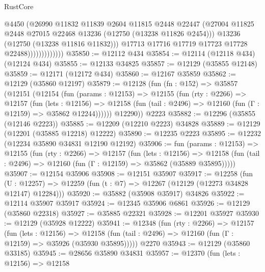 \begin{lexlean}{RustCore}
\begin{coremodule}
                              @4450
                              (@26990
                                @11832
                                @11839
                                @2604
                                @11815
                                @2448
                                @22447
                                (@27004
                                  @11825
                                  @2448
                                  @27015
                                  @22468
                                  @13236
                                  (@12750 (@13238 @11826 @2454)))
                                @13236
                                (@12750 (@13238 @11816 @11832)))
                              @17713
                              @17716
                              @17719
                              @17723
                              @17728
                              @22488)))))))))))))
@35850 := @12112 @434
@35854 := @12114 (@12118 @434) (@12124 @434)
@35855 := @12133 @34825
@35857 := @12129 (@35855 @12148)
@35859 := @12171 (@12172 @434)
@35860 := @12167 @35859
@35862 := @12129 (@35860 @12197)
@35879 := @12128
    (fun (fn : @152) =>
    @35857
      (@12151
        (@12154
          (fun (params : @12153) =>
          @12155
            (fun (rty : @2266) =>
            @12157
              (fun (lets : @12156) =>
              @12158 (fun (tail : @2496) => @12160 (fun (Γ : @12159) => @35862 @12244))))))
        @12290))
    @2223
@35882 := @12296 (@35855 (@12146 @2223))
@35885 := @12209 (@12210 @2223) @34828
@35889 := @12129 (@12201 (@35885 @12218) @12222)
@35890 := @12235 @2223
@35895 := @12232 (@12234 @35890 @34831 @12190 @12192)
@35906 := fun (params : @12153) =>
  @12155
    (fun (rty : @2266) =>
    @12157
      (fun (lets : @12156) =>
      @12158 (fun (tail : @2496) => @12160 (fun (Γ : @12159) => @35862 (@35889 @35895)))))
@35907 := @12154 @35906
@35908 := @12151 @35907
@35917 := @12258
    (fun (U : @12257) => @12259 (fun (t : @7) => @12267 (@12129 (@12273 @34828 @12147) @12284)))
@35920 := @35882 (@35908 @35917) @34826
@35922 := @12114 @35907 @35917
@35924 := @12345 @35906 @6861
@35926 := @12129 (@35860 @22318)
@35927 := @35885 @22321
@35928 := @12201 @35927
@35930 := @12129 (@35928 @12222)
@35941 := @12348
    (fun (rty : @2266) =>
    @12157
      (fun (lets : @12156) =>
      @12158 (fun (tail : @2496) => @12160 (fun (Γ : @12159) => @35926 (@35930 @35895)))))
    @2270
@35943 := @12129 (@35860 @33185)
@35945 := @28656 @35890 @34831
@35957 := @12370
    (fun (lets : @12156) =>
    @12158

\end{coremodule}
\end{lexlean}
